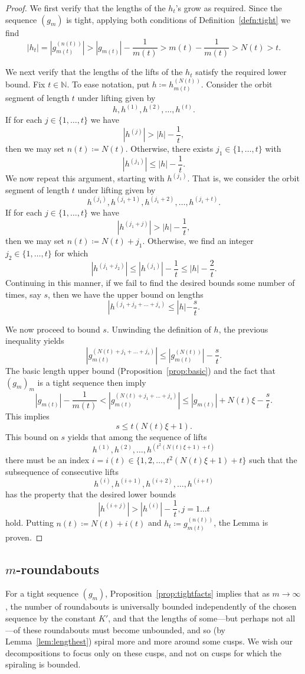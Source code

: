 \documentclass{amsart}
\newcommand\N{{\mathbb{N}}}
\theoremstyle{definition}
\theoremstyle{remark}
\begin{document}
\begin{proof}
  We first verify that the lengths of the $h_t$'s grow as required. Since the sequence $(g_m)$ is tight, applying both conditions of Definition~\ref{defn:tight} we find
\[ |h_t|=|g_{m(t)}^{(n(t))}| > |g_{m(t)}|-\frac{1}{m(t)} > m(t)-\frac{1}{m(t)}>N(t)>t.\]

We next verify that the lengths of the lifts of the $h_t$ satisfy the required lower bound. Fix $t\in \N$.  To ease notation, put $h\coloneqq h_{m(t)}^{(N(t))}$. Consider the orbit segment of length $t$ under lifting given by 
\[ h, h^{(1)}, h^{(2)}, \ldots, h^{(t)}.\]
If for each $j\in \{1, \ldots, t\}$ we have 
\[ |h^{(j)}|>|h|-\frac{1}{t},\]
then we may set $n(t)\coloneqq N(t)$. Otherwise, there exists $j_1\in \{1, \ldots, t\}$ with 
\[ |h^{(j_1)}|\leq |h|-\frac{1}{t}.\]
We now repeat this argument, starting with $h^{(j_1)}$.  That is, we consider the orbit segment of length $t$ under lifting given by 
\[ h^{(j_1)}, h^{(j_1+1)}, h^{(j_1+2)}, \ldots, h^{(j_1+t)}.\]
If for each $j\in \{1, \ldots, t\}$ we have 
\[ |h^{(j_1+j)}|>|h|-\frac{1}{t},\]
then we may set $n(t)\coloneqq N(t)+j_1$. Otherwise, we find an integer $j_2\in \{1, \ldots, t\}$ for which 
\[ |h^{(j_1+j_2)}|\leq |h^{(j_1)}|-\frac{1}{t} \leq |h|-\frac{2}{t}.\]
Continuing in this manner, if we fail to find the desired bounds some number of times, say $s$, then we have the upper bound on lengths
\[ |h^{(j_1+j_2+\ldots+j_s)} \leq |h|-\frac{s}{t}.\]

We now proceed to bound $s$. Unwinding the definition of $h$, the previous inequality yields
\[ \left|g_{m(t)}^{(N(t)+j_1+\ldots+j_s)}\right| \leq \left|g_{m(t)}^{(N(t))}\right|-\frac{s}{t}.\]
The basic length upper bound (Proposition~\ref{prop:basic}) and the fact that $(g_m)_m$ is a tight sequence then imply 
\[ |g_{m(t)}|-\frac{1}{m(t)} < \left|g_{m(t)}^{(N(t)+j_1+\ldots+j_s)}\right| \leq |g_{m(t)}|+N(t)\xi - \frac{s}{t}.\]
This implies
\[ s \leq t(N(t)\xi + 1).\]
This bound on $s$ yields that among the sequence of lifts 
\[ h^{(1)}, h^{(2)}, \ldots, h^{(t^2(N(t)\xi+1)+t)}\]
there must be an index $i=i(t)\in \{1, 2, \ldots, t^2(N(t)\xi+1)+t\}$ such that the subsequence of consecutive lifts 
\[ h^{(i)}, h^{(i+1)}, h^{(i+2)}, \ldots, h^{(i+t)}\]
has the property that the desired lower bounds
\[ |h^{(i+j)}|>|h^{(i)}|-\frac{1}{t}, j=1\ldots t\]
hold. Putting $n(t)\coloneqq N(t)+i(t)$ and $h_t\coloneqq g_{m(t)}^{(n(t))}$, the Lemma is proven.
\end{proof}

\subsection{$m$-roundabouts}
For a tight sequence $(g_m)$, Proposition~\ref{prop:tightfacts} implies that as $m\to\infty$, the number of roundabouts is universally bounded independently of the chosen sequence by the constant $K'$, and that the lengths of some---but perhaps not all---of these roundabouts must become unbounded, and so (by Lemma~\ref{lem:lengthest}) spiral more and more around some cusps. We wish our decompositions to focus only on these cusps, and not on cusps for which the spiraling is bounded. 
\end{document}
